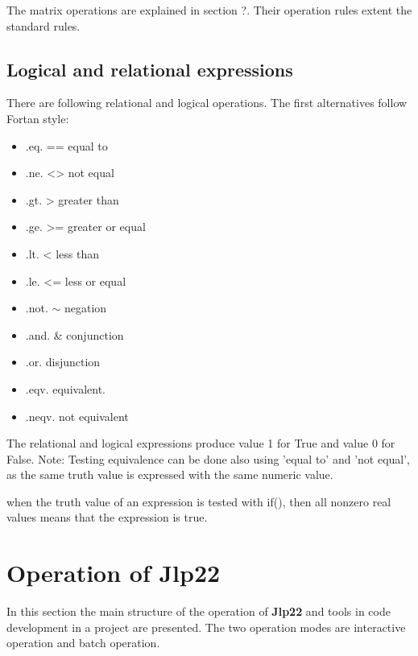 The matrix operations are explained in section ?. Their operation rules extent
the standard rules.
\subsection{Logical and relational expressions}
\label{logic}
There are following relational and logical operations. The first alternatives
follow Fortan style:
\begin{itemize}
\item .eq. == equal to
\item .ne. <> not equal
\item .gt. > greater than
\item .ge. >= greater or equal
\item .lt. < less than
\item .le. <= less or equal
\item .not. $\sim$ negation
\item .and. & conjunction
\item .or. disjunction
\item .eqv. equivalent.
\item .neqv. not equivalent
\end{itemize}

The relational and logical expressions produce value 1 for True and value 0 for False.
Note: Testing equivalence can be done also using 'equal to' and 'not equal', as the same truth
value is expressed with the same numeric value.
\begin{note}
when the truth value of an expression is tested with \textcolor{VioletRed}{if}(), then all nonzero real values
means that the expression is true.
\end{note}


\section{Operation of \textbf{Jlp22}}
\label{joperation}
In this section the main structure of the operation of \textbf{Jlp22} and tools
in code development in a project are presented.
The two operation modes are interactive operation and batch operation.

